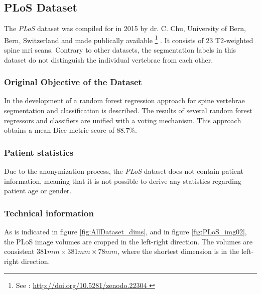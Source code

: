 \subsection{PLoS Dataset}

The \textit{PLoS} dataset was compiled for \cite{Chu2015} in 2015 by dr. C. Chu, University of Bern, Bern, Switzerland and made publically available \footnote{See : \url{ http://doi.org/10.5281/zenodo.22304 }} .
It consists of 23 T2-weighted spine \acrshort{mri} scans. 
Contrary to other datasets, the segmentation labels in this dataset do not distinguish the individual vertebrae from each other.

\subsubsection{Original Objective of the Dataset}

In \cite{Chu2015} the development of a random forest regression approach for spine vertebrae segmentation and classification is described.
The results of several random forest regressors and classifiers are unified with a voting mechanism.
This approach obtains a mean Dice metric score of 88.7\%.

\subsubsection{Patient statistics}

Due to the anonymization process, the \textit{PLoS} dataset does not contain patient information, meaning that it is not possible to derive any statistics regarding patient age or gender.

\subsubsection{Technical information}

As is indicated in figure \ref{fig:AllDataset_dims}, and in figure \ref{fig:PLoS_img02}, the PLoS image volumes are cropped in the left-right direction.
The volumes are consistent $381mm \times 381 mm \times 78 mm$, where the shortest dimension is in the left-right direction.

